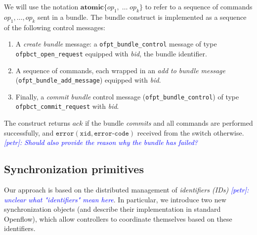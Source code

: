 \documentclass[conference]{sigcomm-alternate}
\newcommand{\hide}[1]{}
\newcommand{\petr}[1]{\textit{\textcolor{blue}{[petr]: #1}}} %
\newcommand{\error}{\texttt{error}}
\newcommand{\xid}{\texttt{xid}}
\newcommand{\ecode}{\texttt{error-code}}
\newcommand{\bundle}{\textbf{atomic}}
\newcommand{\ack}{\textit{ack}}
\begin{document}
We will use the notation
$\bundle\{op_1,\;\ldots\;op_k\}$ to refer to a
sequence of commands $op_1,\ldots,op_k$ sent in a bundle.
The bundle construct is implemented as a sequence of the following
control messages:
\begin{enumerate}
\item A \emph{create bundle} message: a \texttt{ofpt\_bundle\_control} message of type
\texttt{ofpbct\_open\_request} equipped with \textit{bid}, the bundle identifier.
\item A sequence of commands, each wrapped in an
\emph{add to bundle message} (\texttt{ofpt\_bundle\_add\_message})
equipped with \emph{bid}.
\item Finally, a \emph{commit bundle} control message (\texttt{ofpt\_bundle\_control}) of
type \texttt{ofpbct\_commit\_request} with \textit{bid}.
\end{enumerate}
The construct returns $\ack$ if the bundle \emph{commits} and all commands are performed successfully, and
$\error(\xid,\ecode)$ received from the switch otherwise.
\petr{Should also provide the reason why the bundle has failed?}



\hide{
Given this motivation, we now present a more powerful transactional interface.
At a high level, we aim to export a
transactional interface which allows each controller $i\in[N]$ ($N\geq
2$) to perform multiple
operations on the configuration of an OpenFlow switch as an atomic
\emph{transaction}, inspired by the transactional-memory paradigm~\cite{stm-st95,tm-book}. A transaction may \emph{commit}, in
which case it appears as executed sequentially, or \emph{abort}, in
which none of its operations takes effect.
}


\subsection{Synchronization primitives}

Our approach is based on the distributed management of \emph{identifiers (IDs)} \petr{unclear what "identifiers" mean here}. In particular,
we introduce two new synchronization objects (and describe their implementation in standard Openflow),
which allow controllers to coordinate
themselves based on these identifiers.
\end{document}
